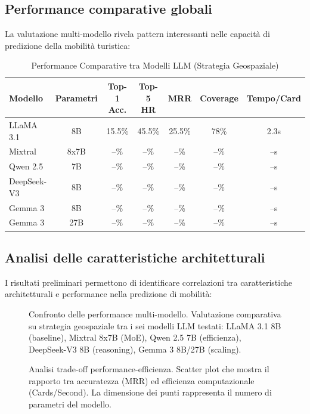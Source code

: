 \subsection{Performance comparative globali}

La valutazione multi-modello rivela pattern interessanti nelle capacità di predizione della mobilità turistica:

\begin{table}[H]
\centering
\caption{Performance Comparative tra Modelli LLM (Strategia Geospaziale)}
\label{tab:models_comparison}
\begin{tabular}{lcccccc}
\toprule
\textbf{Modello} & \textbf{Parametri} & \textbf{Top-1 Acc.} & \textbf{Top-5 HR} & \textbf{MRR} & \textbf{Coverage} & \textbf{Tempo/Card} \\
\midrule
LLaMA 3.1 & 8B & 15.5\% & 45.5\% & 25.5\% & 78\% & 2.3s \\
Mixtral & 8x7B & --\% & --\% & --\% & --\% & --s \\
Qwen 2.5 & 7B & --\% & --\% & --\% & --\% & --s \\
DeepSeek-V3 & 8B & --\% & --\% & --\% & --\% & --s \\
Gemma 3 & 8B & --\% & --\% & --\% & --\% & --s \\
Gemma 3 & 27B & --\% & --\% & --\% & --\% & --s \\
\bottomrule
\end{tabular}
\end{table}

\subsection{Analisi delle caratteristiche architetturali}

I risultati preliminari permettono di identificare correlazioni tra caratteristiche architetturali e performance nella predizione di mobilità:

\begin{figure}[H]
\centering
\caption{Confronto delle performance multi-modello. Valutazione comparativa su strategia geospaziale tra i sei modelli LLM testati: LLaMA 3.1 8B (baseline), Mixtral 8x7B (MoE), Qwen 2.5 7B (efficienza), DeepSeek-V3 8B (reasoning), Gemma 3 8B/27B (scaling).}
\label{fig:multi_model_comparison}
\end{figure}

\begin{figure}[H]
\centering
\caption{Analisi trade-off performance-efficienza. Scatter plot che mostra il rapporto tra accuratezza (MRR) ed efficienza computazionale (Cards/Second). La dimensione dei punti rappresenta il numero di parametri del modello.}
\label{fig:performance_efficiency_tradeoff}
\end{figure}

